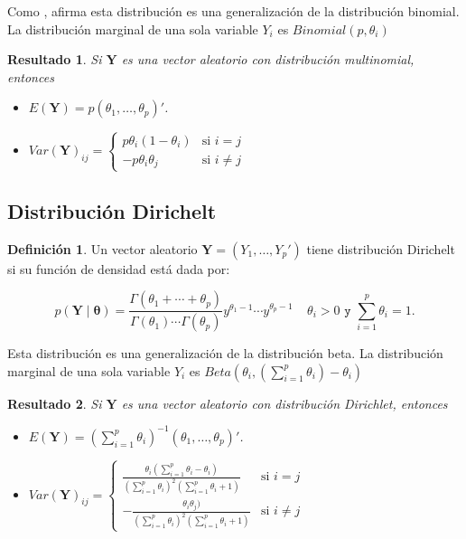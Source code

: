 \documentclass[
  10pt,
  spanish,
]{book}
\providecommand{\tightlist}{%
  \setlength{\itemsep}{0pt}\setlength{\parskip}{0pt}}
\newtheorem{proposition}{Resultado}[chapter]
\theoremstyle{definition}
\newtheorem{definition}{Definición}[chapter]
\theoremstyle{definition}
\theoremstyle{definition}
\theoremstyle{definition}
\theoremstyle{remark}
\begin{document}
Como \citet{Gelman03}, afirma esta distribución es una generalización de la distribución binomial. La distribución marginal de una sola variable \(Y_i\) es \(Binomial(p,\theta_i)\)

\begin{proposition}
\protect\hypertarget{prp:unnamed-chunk-52}{}{\label{prp:unnamed-chunk-52} }Si \(\mathbf{Y}\) es una vector aleatorio con distribución multinomial, entonces

\begin{itemize}
\tightlist
\item
  \(E(\mathbf{Y})=p(\theta_1,\ldots,\theta_p)'\).
\item
  \(Var(\mathbf{Y})_{ij}=  \begin{cases}  p\theta_i(1-\theta_i) & \text{si $i=j$}\\  -p\theta_i\theta_j & \text{si $i\neq j$}  \end{cases}\)
\end{itemize}
\end{proposition}

\hypertarget{distribuciuxf3n-dirichelt}{%
\subsection{Distribución Dirichelt}\label{distribuciuxf3n-dirichelt}}

\begin{definition}
\protect\hypertarget{def:unnamed-chunk-53}{}{\label{def:unnamed-chunk-53} }Un vector aleatorio \(\mathbf{Y}=(Y_1,\ldots,Y_p')\) tiene distribución Dirichelt si su función de densidad está dada por:

\begin{equation}
p(\mathbf{Y} \mid \boldsymbol \theta)=\frac{\Gamma(\theta_1+\cdots+\theta_p)}{\Gamma(\theta_1)\cdots\Gamma(\theta_p)}
y^{\theta_1-1}\cdots y^{\theta_p-1} \ \ \ \ \ \theta_i>0 \texttt{ y } \sum_{i=1}^p\theta_i=1.
\end{equation}
\end{definition}

Esta distribución es una generalización de la distribución beta. La distribución marginal de una sola variable \(Y_i\) es \(Beta(\theta_i,(\sum_{i=1}^p\theta_i)-\theta_i)\)

\begin{proposition}
\protect\hypertarget{prp:unnamed-chunk-54}{}{\label{prp:unnamed-chunk-54} }Si \(\mathbf{Y}\) es una vector aleatorio con distribución Dirichlet, entonces

\begin{itemize}
\tightlist
\item
  \(E(\mathbf{Y})=(\sum_{i=1}^p\theta_i)^{-1}(\theta_1,\ldots,\theta_p)'\).
\item
  \(Var(\mathbf{Y})_{ij}= \begin{cases} \frac{\theta_i(\sum_{i=1}^p\theta_i-\theta_i)}{(\sum_{i=1}^p\theta_i)^2(\sum_{i=1}^p\theta_i+1)} & \text{si $i=j$}\\ -\frac{\theta_i\theta_j)}{(\sum_{i=1}^p\theta_i)^2(\sum_{i=1}^p\theta_i+1)} & \text{si $i\neq j$}  \end{cases}\)
\end{itemize}
\end{proposition}
\end{document}
